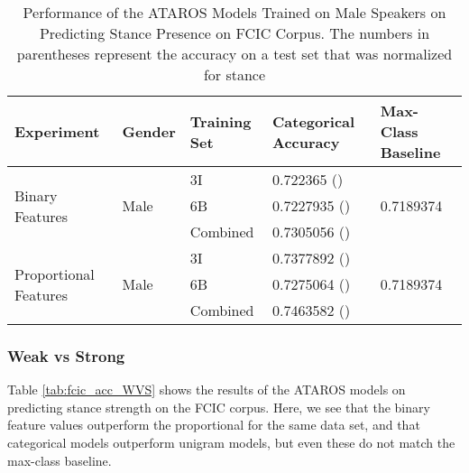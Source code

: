 \begin{table}[h]
\centering
\begin{tabular}{l | l | l | l | l  } 
	\textbf{Experiment}  & \textbf{Gender} & \textbf{Training Set} & \textbf{Categorical Accuracy} &  \textbf{Max-Class Baseline} \\ 
	\hline
	\multirow{3}{*}{Binary Features} & 
	\multirow{3}{*}{Male} & 
		3I   & \num{0.722365} (\num{}) & \multirow{3}{*}{\num{0.7189374}} \\ 
	    &&6B & \num{0.7227935} (\num{}) & \\ 
	    && Combined & \num{0.7305056} (\num{}) &  \\  
	\hline 
	\multirow{3}{*}{Proportional Features} & 
	\multirow{3}{*}{Male} & 
		3I   & \num{0.7377892} (\num{}) & \multirow{3}{*}{\num{0.7189374}} \\ 
	    &&6B & \num{0.7275064} (\num{}) & \\ 
	    && Combined & \num{0.7463582} (\num{}) &  \\  
\end{tabular}	
\caption{Performance of the ATAROS Models Trained on Male Speakers on Predicting Stance Presence on FCIC Corpus.  The numbers in parentheses represent the accuracy on a test set that was normalized for stance} 
\label{tab:fcic_acc_SVN_by_gender} 
\end{table}


\subsubsection{Weak vs Strong} 

Table \ref{tab:fcic_acc_WVS} shows the results of the ATAROS models on predicting stance strength on the FCIC corpus.  Here, we see that the binary feature values outperform the proportional for the same data set, and that categorical models outperform unigram models, but even these do not match the max-class baseline.  

